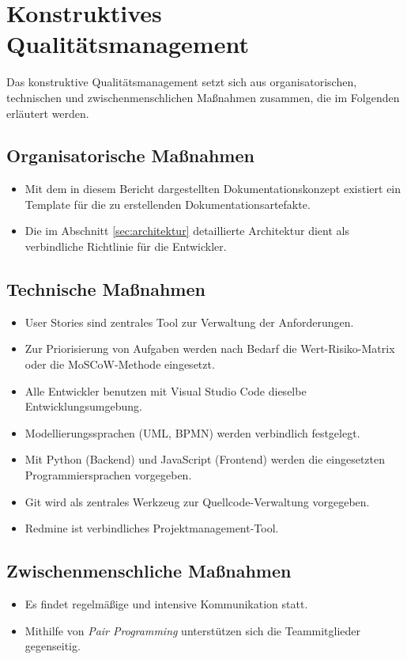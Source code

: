 \documentclass[a4paper,11pt,listof=numbered,glossary=totoc,parskip=half,toc=bib]{scrreprt}
\begin{document}
	\section{Konstruktives Qualitätsmanagement}
	Das konstruktive Qualitätsmanagement setzt sich aus organisatorischen, technischen und zwischenmenschlichen Maßnahmen zusammen, die im Folgenden erläutert werden.
	
	\subsection{Organisatorische Maßnahmen}
	\begin{itemize}
		\item Mit dem in diesem Bericht dargestellten Dokumentationskonzept existiert ein Template für die zu erstellenden Dokumentationsartefakte.
		\item Die im Abschnitt \ref{sec:architektur} detaillierte Architektur dient als verbindliche Richtlinie für die Entwickler.
	\end{itemize}		
	
	\subsection{Technische Maßnahmen}
	\begin{itemize}
		\item User Stories sind zentrales Tool zur Verwaltung der Anforderungen.
		\item Zur Priorisierung von Aufgaben werden nach Bedarf die Wert-Risiko-Matrix oder die MoSCoW-Methode eingesetzt. 
		\item Alle Entwickler benutzen mit Visual Studio Code dieselbe Entwicklungsumgebung.
		\item Modellierungssprachen (UML, BPMN) werden verbindlich festgelegt.
		\item Mit Python (Backend) und JavaScript (Frontend) werden die eingesetzten Programmiersprachen vorgegeben.
		\item Git wird als zentrales Werkzeug zur Quellcode-Verwaltung vorgegeben.
		\item Redmine ist verbindliches Projektmanagement-Tool.
	\end{itemize}
	
	\subsection{Zwischenmenschliche Maßnahmen}
	\begin{itemize}
		\item Es findet regelmäßige und intensive Kommunikation statt.
		\item Mithilfe von \textit{Pair Programming} unterstützen sich die Teammitglieder gegenseitig.
	\end{itemize}		
	
\end{document}
